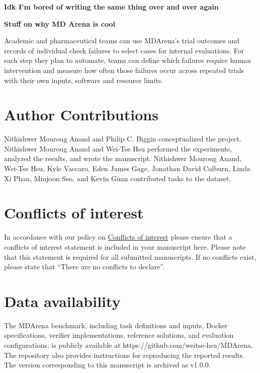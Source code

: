 \documentclass[twoside,twocolumn,9pt]{article}
\begin{document}
\textbf{Idk I'm bored of writing the same thing over and over again}

\textbf{Stuff on why MD Arena is cool}

Academic and pharmaceutical teams can use MDArena's trial outcomes and records of individual check failures to select cases for internal evaluations. For each step they plan to automate, teams can define which failures require human intervention and measure how often those failures occur across repeated trials with their own inputs, software and resource limits.

\section*{Author Contributions}
Nithishwer Mouroug Anand and Philip C. Biggin conceptualized the project.
Nithishwer Mouroug Anand and Wei-Tse Hsu performed the experiments,
analyzed the results, and wrote the manuscript. Nithishwer Mouroug Anand,
Wei-Tse Hsu, Kyle Vaccaro, Eden James Gage, Jonathan David Colburn,
Linda Xi Phan, Minjoon Seo, and Kevin Guan contributed tasks to the dataset.

\section*{Conflicts of interest}
In accordance with our policy on \href{https://www.rsc.org/journals-books-databases/journal-authors-reviewers/author-responsibilities/#code-of-conduct}{Conflicts of interest} please ensure that a conflicts of interest statement is included in your manuscript here.  Please note that this statement is required for all submitted manuscripts.  If no conflicts exist, please state that ``There are no conflicts to declare''.

\section*{Data availability}


The MDArena benchmark, including task definitions and inputs, Docker specifications, verifier implementations, reference solutions, and evaluation configurations, is publicly available at
https://github.com/weitse-hsu/MDArena. The repository also provides instructions for reproducing
the reported results. The version corresponding to this manuscript is archived as v1.0.0.



\end{document}

